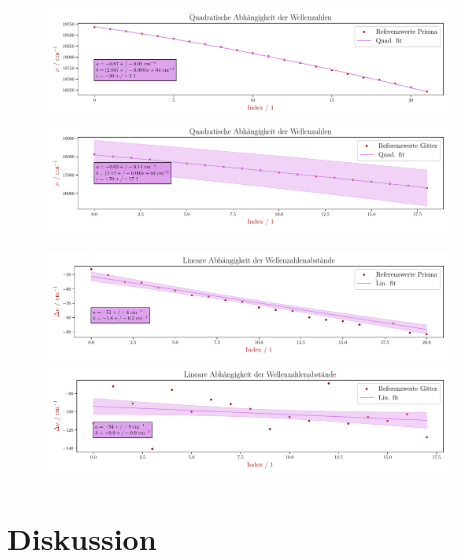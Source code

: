 \documentclass[12pt,english,ngerman]{scrartcl}
\begin{document}
\begin{figure}[H]
	\begin{center}
		\includegraphics[width=0.95\textwidth]{figures/waveNumberFitPrisma.pdf}
		\includegraphics[width=0.95\textwidth]{figures/waveNumberFitGitter.pdf}
	\end{center}
	\caption{}\label{fig:wellenZahlenFit}

\end{figure}

\begin{figure}[H]
	\begin{center}
		\includegraphics[width=0.95\textwidth]{figures/waveNumberDeltasFitPrisma.pdf}
		\includegraphics[width=0.95\textwidth]{figures/waveNumberDeltasFitGitter.pdf}
	\end{center}
	\caption{}\label{fig:wellenZahlenDeltaFit}

\end{figure}

\section{Diskussion}\label{sec:disk}
\end{document}

